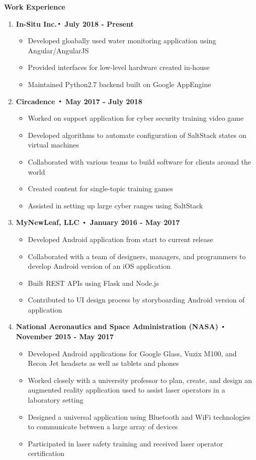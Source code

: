 \noindent\textbf{\large Work Experience}
\begin{enumerate}[label={\Roman*}.]
	\item \textbf{In-Situ Inc.$\Bigcdot$ July 2018 - Present}
		\begin{itemize}
			\item Developed gloabally used water monitoring application using Angular/AngularJS
			\item Provided interfaces for low-level hardware created in-house
			\item Maintained Python2.7 backend built on Google AppEngine
		\end{itemize}
	\item \textbf{Circadence $\Bigcdot$ May 2017 - July 2018}
		\begin{itemize}
			\item Worked on support application for cyber security training video game
			\item Developed algorithms to automate configuration of SaltStack states on virtual machines
			\item Collaborated with various teams to build software for clients around the world
			\item Created content for single-topic training games
			\item Assisted in setting up large cyber ranges using SaltStack
		\end{itemize}
	\item \textbf{MyNewLeaf, LLC $\Bigcdot$ January 2016 - May 2017}
	      \begin{itemize}
	      	\item Developed Android application from start to current release
	      	\item Collaborated with a team of designers, managers, and programmers to develop Android version of an iOS application
	      	\item Built REST APIs using Flask and Node.js
	      	\item Contributed to UI design process by storyboarding Android version of application
	      \end{itemize}

	\item \textbf{National Aeronautics and Space Administration (NASA) $\Bigcdot$ November 2015 - May 2017}
	      \begin{itemize}
	      	\item Developed Android applications for Google Glass, Vuzix M100, and Recon Jet headsets as well as tablets and phones
	      	\item Worked closely with a university professor to plan, create, and design an augmented reality application used to assist laser operators in a laboratory setting
	      	\item Designed a universal application using Bluetooth and WiFi technologies to communicate between a large array of devices
	      	\item Participated in laser safety training and received laser operator certification
	      \end{itemize}


\end{enumerate}
